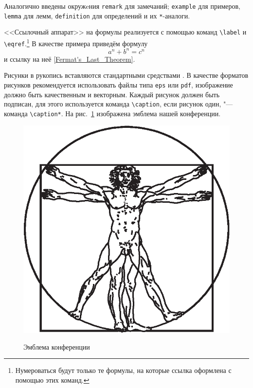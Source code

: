 \documentclass[10pt,twoside,book,a5paper]{ncc}
\begin{document}
Аналогично введены окружeния \verb"remark" для замечаний; \verb"example" для примеров,
\verb"lemma" для лемм, \verb"definition" для определений и их \verb"*"-аналоги.

<<Ссылочный аппарат>> на формулы реализуется с помощью команд \verb"\label" и \verb"\eqref".\footnote{Нумероваться будут только те формулы, на которые ссылка оформлена с помощью этих команд.}
В качестве примера приведём формулу
\begin{equation}
a^n+b^n=c^n
\label{Fermat's_Last_Theorem}
\end{equation}
и ссылку на неё \eqref{Fermat's_Last_Theorem}.

Рисунки в рукопись вставляются стандартными средствами \LaTeXe. 
В качестве форматов рисунков рекомендуется использовать файлы типа \texttt{eps} или \texttt{pdf}, изображение должно быть качественным и векторным. 
Каждый рисунок должен быть подписан, для этого используется команда \verb"\caption", если рисунок один, "--- команда \verb"\caption*".
На рис.~\ref{mmikz-logo} изображена эмблема нашей конференции.

\begin{figure}[h]
\centering
\includegraphics[scale=.5]{emblem}
\label{mmikz-logo}
\caption{Эмблема конференции}
\end{figure}
\end{document}
